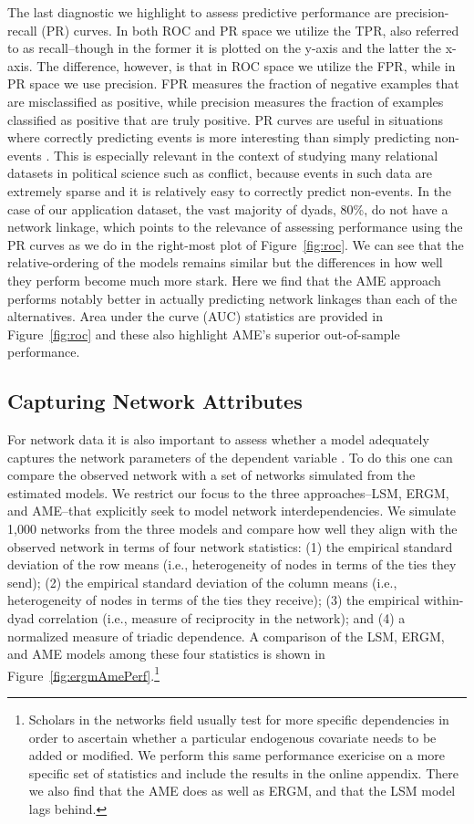 \documentclass[11pt,pdflatex]{elsarticle}
\begin{document}
The last diagnostic we highlight to assess predictive performance are precision-recall (PR) curves. In both ROC and PR space we utilize the TPR, also referred to as recall--though in the former it is plotted on the y-axis and the latter the x-axis. The difference, however, is that in ROC space we utilize the FPR, while in PR space we use precision. FPR measures the fraction of negative examples that are misclassified as positive, while precision measures the fraction of examples classified as positive that are truly positive. PR curves are useful in situations where correctly predicting events is more interesting than simply predicting non-events \citep{davis:goadrich:2006}. This is especially relevant in the context of studying many relational datasets in political science such as conflict, because events in such data are extremely sparse and it is relatively easy to correctly predict non-events. In the case of our application dataset, the vast majority of dyads, 80\%, do not have a network linkage, which points to the relevance of assessing performance using the PR curves as we do in the right-most plot of Figure~\ref{fig:roc}. We can see that the relative-ordering of the models remains similar but the differences in how well they perform become much more stark. Here we find that the AME approach performs notably better in actually predicting network linkages than each of the alternatives. Area under the curve (AUC) statistics are provided in Figure~\ref{fig:roc} and these also highlight AME's superior out-of-sample performance.

\subsection{Capturing Network Attributes}

For network data it is also important to assess whether a model adequately captures the network parameters of the dependent variable \citep{hunter:etal:2008}. To do this one can compare the observed network with a set of networks simulated from the estimated models. We restrict our focus to the three approaches--LSM, ERGM, and AME--that explicitly seek to model network interdependencies. We simulate 1,000 networks from the three models and compare how well they align with the observed network in terms of four network statistics: (1) the empirical standard deviation of the row means (i.e., heterogeneity of nodes in terms of the ties they send); (2) the empirical standard deviation of the column means (i.e., heterogeneity of nodes in terms of the ties they receive); (3) the empirical within-dyad correlation (i.e., measure of reciprocity in the network); and (4) a normalized measure of triadic dependence. A comparison of the LSM, ERGM, and AME models among these four statistics is shown in Figure~\ref{fig:ergmAmePerf}.\footnote{Scholars in the networks field usually test for more specific dependencies in order to ascertain whether a particular endogenous covariate needs to be added or modified. We perform this same performance exericise on a more specific set of statistics and include the results in the online appendix. There we also find that the AME does as well as ERGM, and that the LSM model lags behind.}
\end{document}
